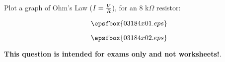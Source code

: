 

Plot a graph of Ohm's Law ($I = {V \over R}$), for an 8 k$\Omega$ resistor:

$$\epsfbox{03184x01.eps}$$







$$\epsfbox{03184x02.eps}$$







{\bf This question is intended for exams only and not worksheets!}.




